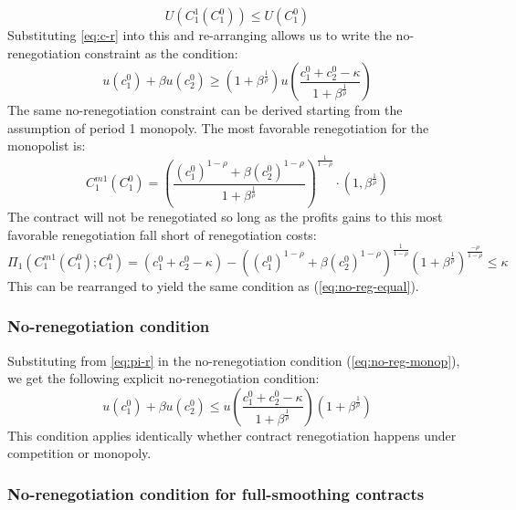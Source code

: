 \documentclass[11pt,english]{article}
\theoremstyle{plain}
\theoremstyle{definition}
\begin{document}
\begin{equation}
U(C_{1}^{1}\left(C_{1}^{0}\right))\le U(C_{1}^{0})\label{eq:uc-r}
\end{equation}
Substituting \ref{eq:c-r} into this and re-arranging allows us to
write the no-renegotiation constraint as the condition:
\begin{equation}
u(c_{1}^{0})+\beta u(c_{2}^{0})\ge(1+\beta^{\frac{1}{\rho}})u\left(\frac{c_{1}^{0}+c_{2}^{0}-\kappa}{1+\beta^{\frac{1}{\rho}}}\right)\label{eq:no-reg-equal}
\end{equation}
The same no-renegotiation constraint can be derived starting from
the assumption of period 1 monopoly. The most favorable renegotiation
for the monopolist is:
\begin{equation}
C_{1}^{m1}\left(C_{1}^{0}\right)=\left(\frac{(c_{1}^{0})^{1-\rho}+\beta(c_{2}^{0})^{1-\rho}}{1+\beta^{\frac{1}{\rho}}}\right)^{\frac{1}{1-\rho}}\cdot\left(1,\beta^{\frac{1}{\rho}}\right)\label{eq:m-r}
\end{equation}
The contract will not be renegotiated so long as the profits gains
to this most favorable renegotiation fall short of renegotiation costs:
\begin{equation}
\Pi_{1}\left(C_{1}^{m1}\left(C_{1}^{0}\right);C_{1}^{0}\right)=\left(c_{1}^{0}+c_{2}^{0}-\kappa\right)-\left((c_{1}^{0})^{1-\rho}+\beta(c_{2}^{0})^{1-\rho}\right)^{\frac{1}{1-\rho}}\left(1+\beta^{\frac{1}{\rho}}\right)^{\frac{-\rho}{1-\rho}}\le\kappa\label{eq:pi-r}
\end{equation}
This can be rearranged to yield the same condition as (\ref{eq:no-reg-equal}).

\subsubsection{No-renegotiation condition}

Substituting from \ref{eq:pi-r} in the no-renegotiation condition
(\ref{eq:no-reg-monop}), we get the following explicit no-renegotiation
condition: 
\begin{equation}
u(c_{1}^{0})+\beta u(c_{2}^{0})\le u\left(\frac{c_{1}^{0}+c_{2}^{0}-\kappa}{1+\beta^{\frac{1}{\rho}}}\right)(1+\beta^{\frac{1}{\rho}})\label{eq:no-renegotiation}
\end{equation}
This condition applies identically whether contract renegotiation
happens under competition or monopoly.

\subsubsection{\textmd{No-renegotiation condition for full-smoothing contracts}}
\end{document}

